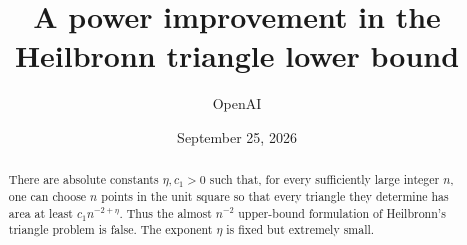 \documentclass[11pt]{article}
\title{A power improvement in the Heilbronn triangle lower bound}
\author{OpenAI}
\date{September 25, 2026}
\theoremstyle{definition}
\theoremstyle{remark}
\numberwithin{equation}{section}
\begin{document}
\maketitle
\begin{abstract}
There are absolute constants $\eta,c_1>0$ such that, for every sufficiently
large integer $n$, one can choose $n$ points in the unit square so that every
triangle they determine has area at least $c_1n^{-2+\eta}$.
Thus the almost $n^{-2}$ upper-bound formulation of Heilbronn's triangle
problem is false. The exponent $\eta$ is fixed but extremely small.
\end{abstract}
\tableofcontents
\clearpage








\appendix

\begingroup
\raggedright


\endgroup
\end{document}
